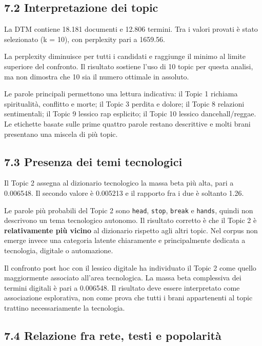 \documentclass[
]{article}
\begin{document}
\subsection{7.2 Interpretazione dei
topic}\label{interpretazione-dei-topic-1}

La DTM contiene 18.181 documenti e 12.806 termini. Tra i valori provati
è stato selezionato (k = 10), con perplexity pari a 1659.56.

La perplexity diminuisce per tutti i candidati e raggiunge il minimo al
limite superiore del confronto. Il risultato sostiene l'uso di 10 topic
per questa analisi, ma non dimostra che 10 sia il numero ottimale in
assoluto.

Le parole principali permettono una lettura indicativa: il Topic 1
richiama spiritualità, conflitto e morte; il Topic 3 perdita e dolore;
il Topic 8 relazioni sentimentali; il Topic 9 lessico rap esplicito; il
Topic 10 lessico dancehall/reggae. Le etichette basate sulle prime
quattro parole restano descrittive e molti brani presentano una miscela
di più topic.

\subsection{7.3 Presenza dei temi
tecnologici}\label{presenza-dei-temi-tecnologici}

Il Topic 2 assegna al dizionario tecnologico la massa beta più alta,
pari a 0.006548. Il secondo valore è 0.005213 e il rapporto fra i due è
soltanto 1.26.

Le parole più probabili del Topic 2 sono \texttt{head}, \texttt{stop},
\texttt{break} e \texttt{hands}, quindi non descrivono un tema
tecnologico autonomo. Il risultato corretto è che il Topic 2 è
\textbf{relativamente più vicino} al dizionario rispetto agli altri
topic. Nel corpus non emerge invece una categoria latente chiaramente e
principalmente dedicata a tecnologia, digitale o automazione.

Il confronto post hoc con il lessico digitale ha individuato il Topic 2
come quello maggiormente associato all'area tecnologica. La massa beta
complessiva dei termini digitali è pari a 0.006548. Il risultato deve
essere interpretato come associazione esplorativa, non come prova che
tutti i brani appartenenti al topic trattino necessariamente la
tecnologia.

\subsection{7.4 Relazione fra rete, testi e
popolarità}\label{relazione-fra-rete-testi-e-popolarituxe0}
\end{document}
